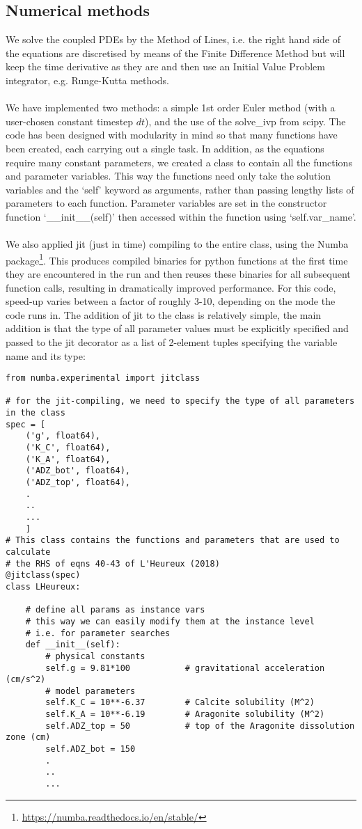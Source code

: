 \documentclass[a4paper]{article}
\newcommand{\python}{\color{darkgray} \sffamily }
\begin{document}
\subsection*{Numerical methods}
We solve the coupled PDEs by the Method of Lines, i.e. the right hand side of the equations are discretised by means of the Finite Difference Method but will keep the time derivative as they are and then use an Initial Value Problem integrator, e.g. Runge-Kutta methods.\\\\
We have implemented two methods: a simple 1st order Euler method (with a user-chosen constant timestep $dt$), and the use of the {\python solve\_ivp} from {\python scipy}. %
The code has been designed with modularity in mind so that many functions have been created, each carrying out a single task.  In addition, as the equations require many constant parameters, we created a class to contain all the functions and parameter variables.  This way the functions need only take the solution variables and the `self' keyword as arguments, rather than passing lengthy lists of parameters to each function.  Parameter variables are set in the constructor function `\_\_init\_\_(self)' then accessed within the function using `self.var\_name'.\\\\
We also applied jit (just in time) compiling to the entire class, using the Numba package\footnote{\url{https://numba.readthedocs.io/en/stable/}}.  This produces compiled binaries for python functions at the first time they are encountered in the run and then reuses these binaries for all subsequent function calls, resulting in dramatically improved performance.  For this code, speed-up varies between a factor of roughly 3-10, depending on the mode the code runs in.  The addition of jit to the class is relatively simple, the main addition is that the type of all parameter values must be explicitly specified and passed to the jit decorator as a list of 2-element tuples specifying the variable name and its type:
\begin{lstlisting}
from numba.experimental import jitclass

# for the jit-compiling, we need to specify the type of all parameters in the class
spec = [
    ('g', float64),
    ('K_C', float64),
    ('K_A', float64),
    ('ADZ_bot', float64),
    ('ADZ_top', float64),
    .
    ..
    ...
    ]
# This class contains the functions and parameters that are used to calculate
# the RHS of eqns 40-43 of L'Heureux (2018)
@jitclass(spec)
class LHeureux:
    
    # define all params as instance vars
    # this way we can easily modify them at the instance level
    # i.e. for parameter searches
    def __init__(self):
        # physical constants
        self.g = 9.81*100           # gravitational acceleration (cm/s^2)
        # model parameters
        self.K_C = 10**-6.37        # Calcite solubility (M^2)
        self.K_A = 10**-6.19        # Aragonite solubility (M^2)
        self.ADZ_top = 50           # top of the Aragonite dissolution zone (cm)
        self.ADZ_bot = 150
        .
        ..
        ...
\end{lstlisting}
\end{document}
